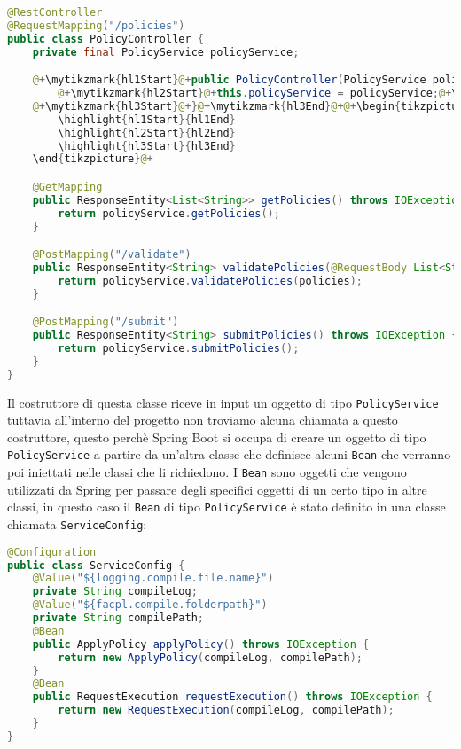\begin{lstlisting}[language=Java, caption=PolicyController, label=code:PolicyController, basicstyle=\fontsize{10}{11}\ttfamily]
@RestController
@RequestMapping("/policies")
public class PolicyController {
    private final PolicyService policyService;

    @+\mytikzmark{hl1Start}@+public PolicyController(PolicyService policyService) {@+\mytikzmark{hl1End}@+
        @+\mytikzmark{hl2Start}@+this.policyService = policyService;@+\mytikzmark{hl2End}@+
    @+\mytikzmark{hl3Start}@+}@+\mytikzmark{hl3End}@+@+\begin{tikzpicture}[remember picture, overlay]
        \highlight{hl1Start}{hl1End}
        \highlight{hl2Start}{hl2End}
        \highlight{hl3Start}{hl3End}
    \end{tikzpicture}@+

    @GetMapping
    public ResponseEntity<List<String>> getPolicies() throws IOException {
        return policyService.getPolicies();
    }

    @PostMapping("/validate")
    public ResponseEntity<String> validatePolicies(@RequestBody List<String> policies) throws IOException {
        return policyService.validatePolicies(policies);
    }

    @PostMapping("/submit")
    public ResponseEntity<String> submitPolicies() throws IOException {
        return policyService.submitPolicies();
    }
}    
\end{lstlisting}
Il costruttore di questa classe riceve in input un oggetto di tipo \texttt{PolicyService} tuttavia all'interno del progetto non troviamo alcuna chiamata a questo costruttore, questo perchè Spring Boot si occupa di creare un oggetto di tipo \texttt{PolicyService} a partire da un'altra classe che definisce alcuni \texttt{Bean} che verranno poi iniettati nelle classi che li richiedono. I \texttt{Bean} sono oggetti che vengono utilizzati da Spring per passare degli specifici oggetti di un certo tipo in altre classi, in questo caso il \texttt{Bean} di tipo \texttt{PolicyService} è stato definito in una classe chiamata \texttt{ServiceConfig}:
\begin{lstlisting}[language=Java, caption=ServiceConfig, label=code:ServiceConfig]
@Configuration
public class ServiceConfig {
    @Value("${logging.compile.file.name}")
    private String compileLog;
    @Value("${facpl.compile.folderpath}")
    private String compilePath;
    @Bean
    public ApplyPolicy applyPolicy() throws IOException {
        return new ApplyPolicy(compileLog, compilePath);
    }
    @Bean
    public RequestExecution requestExecution() throws IOException {
        return new RequestExecution(compileLog, compilePath);
    }
}
\end{lstlisting}

